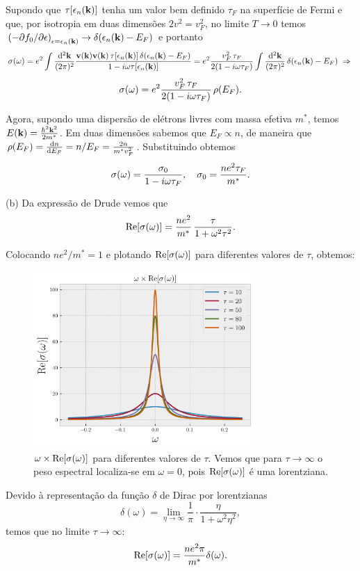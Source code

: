 \documentclass[a4paper,10pt]{article}
\begin{document}
Supondo que $\tau[\epsilon_n(\vb{k})]$ tenha um valor bem definido $\tau_F$ na superfície de Fermi e que, por isotropia em duas dimensões $2v^2 = v_F^2$, no limite $T \to 0$ temos $\qty(-\partial f_0 / \partial \epsilon)_{\epsilon = \epsilon_n(\vb{k})} \to \delta(\epsilon_n(\vb{k}) - E_F)$ e portanto
$$
\sigma(\omega) = e^2 \int \frac{\dd[2]{\vb{k}}}{(2\pi)^2}
\frac{\vb{v}(\vb{k}) \vb{v}(\vb{k}) \, \tau[\epsilon_n(\vb{k})] \, \delta(\epsilon_n(\vb{k}) - E_F)}
{1-i\omega \tau[\epsilon_n(\vb{k})]} =
e^2 \frac{v_F^2 \, \tau_F }{2(1-i\omega \tau_F)}
\int \frac{\dd[2]{\vb{k}}}{(2\pi)^2} \, \delta(\epsilon_n(\vb{k}) - E_F) \; \Rightarrow \;
$$
$$
\sigma(\omega) = e^2 \frac{v_F^2 \, \tau_F }{2(1-i\omega \tau_F)} \, \rho(E_F).
$$

Agora, supondo uma dispersão de elétrons livres com massa efetiva $m^*$, temos $E(\vb{k}) = \frac{\hbar^2 \vb{k}^2}{2m^*}$. Em duas dimensões sabemos que $E_F \propto n$, de maneira que $\rho(E_F) = \dv{n}{E_F} = n/E_F = \frac{2 n}{m^* v_F^2}$. Substituindo obtemos
$$
\sigma(\omega) = \frac{\sigma_0}{1-i\omega \tau_F}, \quad \sigma_0 = \frac{n e^2 \tau_F}{m^*}.
$$

(b) Da expressão de Drude vemos que
$$
\Re[\sigma(\omega)] = \frac{ne^2}{m^*} \, \frac{\tau}{1+\omega^2 \tau^2}.
$$

Colocando $ne^2/m^* = 1$ e plotando $\Re[\sigma(\omega)]$ para diferentes valores de $\tau$, obtemos:
\begin{figure}[H]
\centering
\includegraphics[width=0.75\textwidth]{fig/resigma.png}
\caption{$\omega \times \Re[\sigma(\omega)]$ para diferentes valores de $\tau$. Vemos que para $\tau \to \infty$ o peso espectral localiza-se em $\omega = 0$, pois $\Re[\sigma(\omega)]$ é uma lorentziana.}
\label{fig:resigma}
\end{figure}

Devido à representação da função $\delta$ de Dirac por lorentzianas
$$
\delta(\omega) = \lim_{\eta \to \infty} \frac{1}{\pi} \cdot \frac{\eta}{1 + \omega^2 \eta^2},
$$
temos que no limite $\tau \to \infty$:
$$
\Re[\sigma(\omega)] = \frac{ne^2 \pi}{m^*} \delta(\omega).
$$
\end{document}
